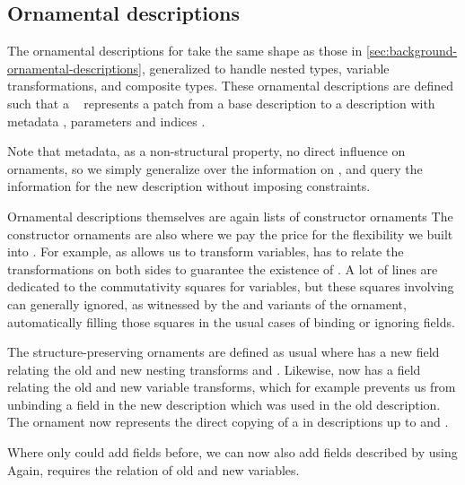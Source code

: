 \subsection{Ornamental descriptions}
The ornamental descriptions for  take the same shape as those in \autoref{sec:background-ornamental-descriptions}, generalized to handle nested types, variable transformations, and composite types. These ornamental descriptions are defined such that a \  represents a patch from a base description  to a description with metadata , parameters  and indices .

Note that metadata, as a non-structural property, no direct influence on ornaments, so we simply generalize over the information on , and query the information for the new description without imposing constraints.

Ornamental descriptions themselves are again lists of constructor ornaments 
The constructor ornaments are also where we pay the price for the flexibility we built into . For example, as  allows us to transform variables,  has to relate the transformations on both sides to guarantee the existence of . A lot of lines are dedicated to the commutativity squares for variables, but these squares involving  can generally ignored, as witnessed by the  and  variants of the  ornament, automatically filling those squares in the usual cases of binding or ignoring fields.

The structure-preserving ornaments are defined as usual
where  has a new field relating the old and new nesting transforms  and . Likewise,  now has a field relating the old and new variable transforms, which for example prevents us from unbinding a field in the new description which was used in the old description. The ornament  now represents the direct copying of a  in descriptions up to  and .

Where only  could add fields before, we can now also add fields described by  using 
Again,  requires the relation of old and new variables.

